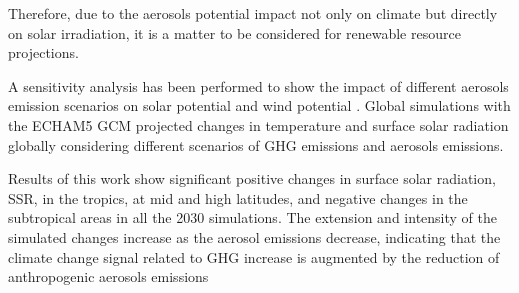 Therefore, due to the aerosols potential impact not only on climate but directly on solar irradiation, it is a matter to be considered for renewable resource projections.

A sensitivity analysis has been performed to show the impact of different aerosols emission scenarios on solar potential and wind potential \cite*{Gaetani2014}. Global simulations with the ECHAM5 GCM projected changes in temperature and surface solar radiation globally considering different scenarios of GHG emissions and aerosols emissions. 

Results of this work show significant positive changes in surface solar radiation, SSR, in the tropics, at mid and high latitudes, and negative changes in the subtropical areas in all the 2030 simulations. The extension and intensity of the simulated changes increase as the aerosol emissions decrease, indicating that the climate change signal related to GHG increase is augmented by the reduction of anthropogenic aerosols emissions \cite*{Kloster2008, Kloster2010}




